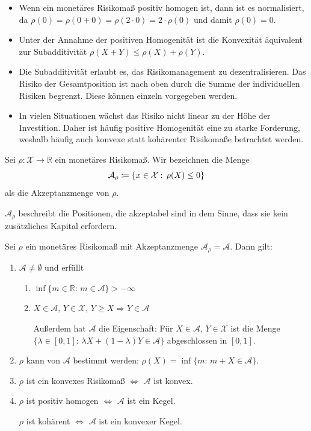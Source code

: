\documentclass[a4paper,twoside,DIV15,BCOR12mm]{scrbook}
\begin{document}
\begin{bemerkung}
\begin{itemize}
\item Wenn ein monetäres Risikomaß positiv homogen ist, dann ist es normalisiert, da $\rho(0)=\rho(0+0)=\rho(2\cdot 0)=2\cdot \rho(0)$ und damit $\rho(0)=0$.
\item Unter der Annahme der positiven Homogenität ist die Konvexität äquivalent zur Subadditivität $\rho(X+Y)\leq \rho(X)+\rho (Y)$.
\item Die Subadditivität erlaubt es, das Risikomanagement zu dezentralisieren. Das Risiko der Gesamtposition ist nach oben durch die Summe der individuellen Risiken begrenzt. Diese können einzeln vorgegeben werden.
\item In vielen Situationen wächst das Risiko nicht linear zu der Höhe der Investition. Daher ist häufig positive Homogenität eine zu starke Forderung, weshalb häufig auch konvexe statt kohärenter Risikomaße betrachtet werden.
\end{itemize}
\end{bemerkung}

\begin{definition}
Sei $\rho:\mathcal{X}\to\mathbb{R}$ ein monetäres Risikomaß. Wir bezeichnen die Menge
\[
\mathcal{A}_\rho\da\{x\in \mathcal{X}:\, \rho(X)\leq 0\}
\]
als die Akzeptanzmenge von $\rho$.

$\mathcal{A}_\rho$ beschreibt die Positionen, die akzeptabel sind in dem Sinne, dass sie kein zusätzliches Kapital erfordern.
\end{definition}

\begin{satz}
Sei $\rho$ ein monetäres Risikomaß mit Akzeptanzmenge $\mathcal{A}_\rho=\mathcal{A}$. Dann gilt:
\begin{enumerate}
\item $\mathcal{A}\neq\emptyset$ und erfüllt

\begin{enumerate}
\item $\inf\{m\in\mathbb{R}:\, m\in\mathcal{A}\}>-\infty$
\item $X\in\mathcal{A},\, Y\in\mathcal{X}, \, Y\geq X \Rightarrow Y\in\mathcal{A}$

Außerdem hat $\mathcal{A}$ die Eigenschaft: Für $X\in\mathcal{A},\, Y\in\mathcal{X}$ ist die Menge $\{\lambda\in[0,1]:\, \lambda X+(1-\lambda) Y\in\mathcal{A}\}$ abgeschlossen in $[0,1]$.
\end{enumerate}

\item $\rho$ kann von $\mathcal{A}$ bestimmt werden: $\rho(X)=\inf\{m:\, m+X\in\mathcal{A}\}$.
\item $\rho$ ist ein konvexes Risikomaß $\Leftrightarrow$ $\mathcal{A}$ ist konvex.
\item $\rho$ ist positiv homogen $\Leftrightarrow$ $\mathcal{A}$ ist ein Kegel.

$\rho$ ist kohärent $\Leftrightarrow$ $\mathcal{A}$ ist ein konvexer Kegel.
\end{enumerate}
\end{satz}
\end{document}

